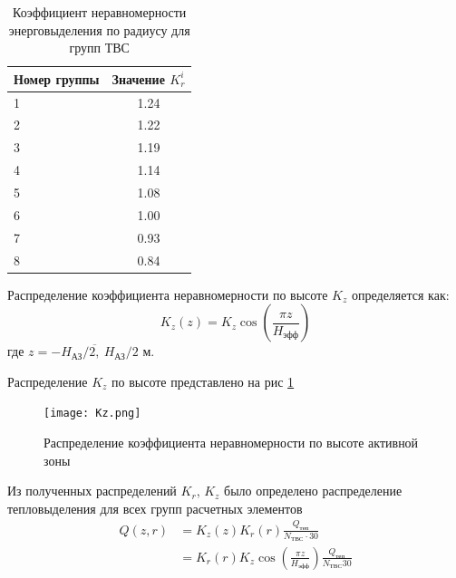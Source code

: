 \begin{table}[H]
	\caption{Коэффициент неравномерности энерговыделения по радиусу для групп ТВС}
	\begin{center}
        \begin{tabular}{|l|c|}
        \toprule
         Номер группы & Значение $K_r^i$ \\
         \midrule
         \hline
         1 & 1.24 \\
         \hline
         2 & 1.22 \\
         \hline
         3 & 1.19 \\
         \hline
         4 & 1.14 \\
         \hline
         5 & 1.08 \\
         \hline
         6 & 1.00 \\
         \hline
         7 & 0.93 \\
         \hline
         8 & 0.84 \\
         \bottomrule
		\end{tabular}
		\label{tabular:Kri}
	\end{center}
\end{table}


\noindent Распределение коэффициента неравномерности по высоте $K_z$ определяется как:
\begin{equation}
    K_z(z) = K_z \cos \left( \frac {\pi z} {H_{\text{эфф}}} \right)
\end{equation}
где $z = \overline{-H_{\text{АЗ}} / 2,\  H_{\text{АЗ}} / 2}$ м.


\noindent Распределение $K_z$ по высоте представлено на рис \ref{pic:Kz}


\begin{figure}[H]
	\begin{center}
		\texttt{[image: Kz.png]}
		\caption{Распределение коэффициента неравномерности по высоте активной зоны}
		\label{pic:Kz}
	\end{center}
\end{figure}


Из полученных распределений $K_r$, $K_z$ было определено распределение тепловыделения для всех групп расчетных элементов
\begin{align}
    \label{equation:Qzr}
    Q(z, r) &= K_z(z)K_r(r)\frac{Q_{\text{теп}}}{N_{\text{ТВС}} \cdot 30} \\
            &= K_r(r) K_z \cos \left( \frac{\pi z}{H_{\text{эфф}}} \right) \frac{Q_{\text{теп}}}{N_{\text{ТВС}} 30}
\end{align}

